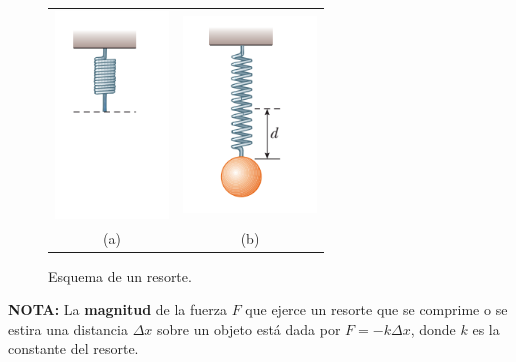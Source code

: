 \documentclass{article}
\begin{document}
\begin{enumerate}
\begin{figure}[H]
\centering
\begin{tabular}{cc}
\includegraphics[scale=0.5]{problema_7a.png} & \includegraphics[scale=0.5]{problema_7b.png}\\
(a) & (b)
\end{tabular}

\caption{Esquema de un resorte.}
\end{figure}

\textbf{NOTA:} La \textbf{magnitud} de la fuerza $F$ que ejerce un resorte que se comprime o se estira una distancia $\Delta x$ sobre un objeto está dada por $F=-k\Delta x$, donde $k$ es la constante del resorte. 

\end{enumerate}
\end{document}

